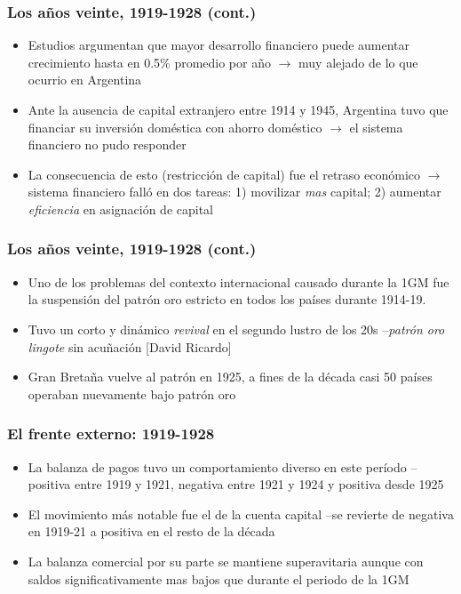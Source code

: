 \documentclass[14pt,aspectratio=169]{beamer}
\begin{document}
      

   \begin{frame}\frametitle{Los años veinte, 1919-1928 (cont.)}
    \begin{itemize}\itemsep 10pt
      \item Estudios argumentan que mayor desarrollo financiero puede
        aumentar crecimiento hasta en 0.5\% promedio por año
        $\longrightarrow$ muy alejado de lo que ocurrio en Argentina
        \item Ante la ausencia de capital extranjero entre 1914 y
          1945, Argentina tuvo que financiar su inversión doméstica
          con ahorro doméstico $\longrightarrow$ el sistema financiero
          no pudo responder
          \item La consecuencia de esto (restricción de capital) fue
            el retraso económico $\longrightarrow$ sistema financiero
            falló en dos tareas: 1) movilizar \textit{mas} capital; 2)
            aumentar \textit{eficiencia} en asignación de capital
                   \end{itemize}
      \end{frame}



       \begin{frame}\frametitle{Los años veinte, 1919-1928 (cont.)}
    \begin{itemize}\itemsep 10pt
      \item Uno de los problemas del contexto internacional causado
        durante la 1GM fue la suspensión del patrón oro estricto en
        todos los países durante 1914-19.
        \item Tuvo un corto y dinámico \textit{revival} en el segundo
          lustro de los 20s --\textit{patrón oro lingote} sin
          acuñación [David Ricardo]
          \item Gran Bretaña vuelve al patrón en 1925, a fines de la
            década casi 50 países operaban nuevamente bajo patrón oro
                   \end{itemize}
      \end{frame}
      
      

 \begin{frame}\frametitle{El frente externo: 1919-1928}
    \begin{itemize}\itemsep 10pt
      \item La balanza de pagos tuvo un comportamiento diverso en este
        período --positiva entre 1919 y 1921, negativa entre 1921 y
        1924 y positiva desde 1925
        \item El movimiento más notable fue el de la cuenta capital
          --se revierte de negativa en 1919-21 a positiva en el resto
          de la década
          \item La balanza comercial por su parte se mantiene
            superavitaria aunque con saldos significativamente mas
            bajos que durante el periodo de la 1GM
                   \end{itemize}
      \end{frame}
\end{document}

